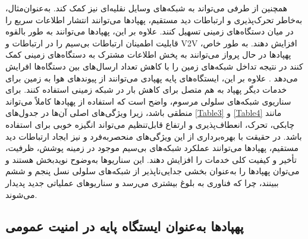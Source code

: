 همچنین از طرفی می‌تواند به شبکه‌های وسایل نقلیه‌ای نیز کمک کند. به‌عنوان‌مثال، به‌خاطر تحرک‌پذیری و ارتباطات دید مستقیم، پهپادها می‌توانند انتشار اطلاعات سریع را در میان دستگاه‌های زمینی تسهیل کنند. علاوه بر این، پهپادها می‌توانند به طور بالقوه قابلیت اطمینان ارتباطات بی‌سیم را در ارتباطات  و \gls{V2V} افزایش دهند. به طور خاص، پهپادها در حال پرواز می‌توانند به پخش اطلاعات مشترک به دستگاه‌های زمینی کمک کنند در نتیجه تداخل شبکه‌های زمین را با کاهش تعداد ارسال‌های بین دستگاه‌ها افرایش می‌دهد \cite{8638578}.
علاوه بر این، ایستگاه‌های پایه پهپادی می‌توانند از پیوندهای هوا به زمین برای خدمات دیگر پهپاد به هم متصل برای کاهش بار در شبکه زمینی استفاده کنند.
برای سناریوی شبکه‌های سلولی مرسوم، واضح است که استفاده از پهپادها کاملاً می‌تواند منطقی باشد، زیرا ویژگی‌های اصلی آن‌ها در جدول‌های \autoref{Table3} و \autoref{Table4} مانند چابکی، تحرک، انعطاف‌پذیری و ارتفاع قابل‌تنظیم می‌تواند انگیزه خوبی برای استفاده باشد. در حقیقت با بهره‌برداری از این ویژگی‌های منحصربه‌فرد و نیز ایجاد ارتباطات دید مستقیم، پهپادها می‌توانند عملکرد شبکه‌های بی‌سیم موجود در زمینه پوشش، ظرفیت، تأخیر و کیفیت کلی خدمات را افزایش دهند. این سناریوها به‌وضوح نویدبخش هستند و می‌توان پهپادها را به‌عنوان بخشی جدایی‌ناپذیر از شبکه‌های سلولی نسل پنجم و ششم ببینند، چرا که فناوری به بلوغ بیشتری می‌رسد و سناریوهای عملیاتی جدید پدیدار می‌شوند.
 

 

\subsection{پهپادها به‌عنوان ایستگاه پایه در امنیت عمومی} 

